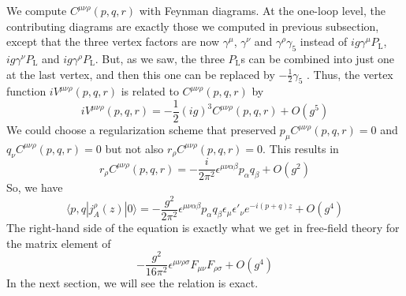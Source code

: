 We compute $C^{\mu\nu\rho}(p,q,r)$ with Feynman diagrams. At the one-loop level, the contributing diagrams are exactly those we computed in previous subsection, except that the three vertex factors are now $\gamma^{\mu}$, $\gamma^{\nu}$ and $\gamma^{\rho}\gamma_5$ instead of $ig\gamma^{\mu}P_{\mathrm{L}}$, $ig\gamma^{\nu}P_{\mathrm{L}}$ and $ig\gamma^{\rho}P_{\mathrm{L}}$. But, as we saw, the three $P_{\mathrm{L}}$s can be combined into just one at the last vertex, and then this one can be replaced by $-\frac{1}{2}\gamma_5$ . Thus, the vertex function $iV^{\mu\nu\rho}(p,q,r)$ is related to $C^{\mu\nu\rho}(p,q,r)$ by
\[iV^{\mu\nu\rho}(p,q,r) = -\frac{1}{2}(ig)^3 C^{\mu\nu\rho}(p,q,r) + O(g^5)\]
We could choose a regularization scheme that
preserved $p_{\mu}C^{\mu\nu\rho}(p,q,r) = 0$ and $q_{\nu}C^{\mu\nu\rho}(p,q,r) = 0$ but not also $r_{\rho}C^{\mu\nu\rho}(p,q,r) = 0$. This results in
\[r_{\rho}C^{\mu\nu\rho}(p,q,r) = -\frac{i}{2\pi^2} \epsilon^{\mu\nu\alpha\beta} p_{\alpha} q_{\beta} + O(g^2)\]
So, we have
\[\langle p,q | j^{\rho}_A(z) |  0 \rangle  = - \frac{g^2}{2\pi^2} \epsilon^{\mu\nu\alpha\beta} p_{\alpha} q_{\beta} \epsilon_{\mu} \epsilon'_{\nu} e^{-i(p+q)z} + O(g^4) \]
The right-hand side of the equation is exactly what we get in free-field theory for the matrix element of
\[- \frac{g^2}{16\pi^2} \epsilon^{\mu\nu\rho\sigma}F_{\mu\nu}F_{\rho\sigma} + O(g^4) \]
In the next section, we will see the relation is exact.


